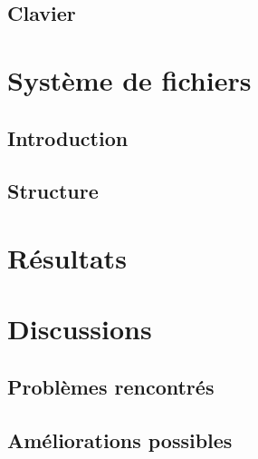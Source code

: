 \documentclass[a4paper, 12pt]{article}
\begin{document}

\subsection{Clavier}

\newpage

\section{Système de fichiers}
\subsection{Introduction}


\subsection{Structure}

\newpage

\section{Résultats}

\newpage

\section{Discussions}
\subsection{Problèmes rencontrés}


\subsection{Améliorations possibles}
\end{document}

